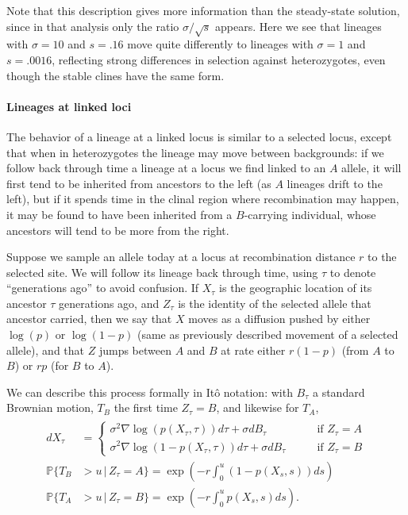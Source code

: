 \documentclass[11pt,letterpaper]{article}
\renewcommand{\P}{\mathbb{P}}
\newcommand{\grad}{\nabla}
\newcommand{\given}{\,\vert\,}
\begin{document}
Note that this description gives more information than the steady-state solution,
since in that analysis only the ratio $\sigma/\sqrt{s}$ appears.
Here we see that lineages with $\sigma=10$ and $s=.16$ move quite differently
to lineages with $\sigma=1$ and $s=.0016$,
reflecting strong differences in selection against heterozygotes,
even though the stable clines have the same form.

\paragraph{Lineages at linked loci}
The behavior of a lineage at a linked locus is similar to a selected locus,
except that when in heterozygotes the lineage may move between backgrounds:
if we follow back through time a lineage at a locus we find linked to an $A$ allele, 
it will first tend to be inherited from ancestors to the left (as $A$ lineages drift to the left),
but if it spends time in the clinal region where recombination may happen,
it may be found to have been inherited from a $B$-carrying individual,
whose ancestors will tend to be more from the right.

Suppose we sample an allele today at a locus at recombination distance $r$ to the selected site.
We will follow its lineage back through time, using $\tau$ to denote ``generations ago'' to avoid confusion.
If $X_\tau$ is the geographic location of its ancestor $\tau$ generations ago,
and $Z_\tau$ is the identity of the selected allele that ancestor carried,
then we say that $X$ moves as a diffusion pushed by either $\log(p)$ or $\log(1-p)$ (same as previously described movement of a selected allele),
and that $Z$ jumps between $A$ and $B$ at rate either $r (1-p)$  (from $A$ to $B$) or $r p$ (for $B$ to $A$).

We can describe this process formally in It\^o notation:
with $B_\tau$ a standard Brownian motion,
$T_B$ the first time $Z_\tau = B$, and likewise for $T_A$,
\begin{align}
    \begin{aligned} \label{eqn:lineage_motion}
        dX_\tau &= \begin{cases}
             \sigma^2 \grad \log(p(X_\tau,\tau)) d\tau + \sigma dB_\tau \qquad & \text{if } Z_\tau = A \\
             \sigma^2 \grad \log(1-p(X_\tau,\tau)) d\tau + \sigma dB_\tau \qquad & \text{if } Z_\tau = B 
        \end{cases} \\
        \P\{ T_B &> u \given Z_\tau = A \} = \exp\left( - r \int_0^u (1-p(X_s,s)) ds \right) \\
        \P\{ T_A &> u \given Z_\tau = B \} = \exp\left( - r \int_0^u p(X_s,s) ds \right) .
    \end{aligned}
\end{align}
\end{document}
